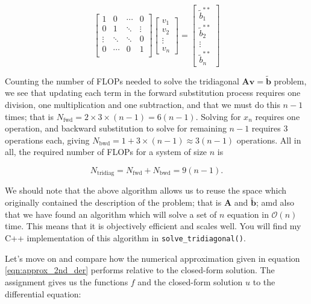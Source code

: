 \documentclass[]{article}
\begin{document}
\begin{equation*}
\left[ \begin{matrix}
1 & 0 & \cdots & 0 \\
0 & 1 & \ddots & \vdots \\
\vdots & \ddots & \ddots & 0\\
0 & \cdots & 0 & 1 \\
\end{matrix} \right]
\left[ \begin{matrix}
v_1 \\
v_2 \\
\vdots \\
v_n
\end{matrix} \right] = 
\left[ \begin{matrix}
\tilde{b}_{1}^{\ast\ast} \\
\tilde{b}_{2}^{\ast\ast} \\
\vdots \\
\tilde{b}_{n}^{\ast\ast}
\end{matrix} \right]
\end{equation*}

Counting the number of FLOPs needed to solve the tridiagonal $\mathbf{Av} = \mathbf{\tilde{b}}$ problem, we see that updating each term in the forward substitution process requires one division, one multiplication and one subtraction, and that we must do this $n-1$ times; that is $N_{\text{fwd}} = 2 \times 3 \times (n-1) = 6(n-1)$. Solving for $x_n$ requires one operation, and backward substitution to solve for remaining $n-1$ requires 3 operations each, giving $N_{\text{bwd}} = 1 + 3 \times (n-1) \approx 3(n-1)$ operations. All in all, the required number of FLOPs for a system of size $n$ is

\begin{equation*}
N_{\text{tridiag}} = N_{\text{fwd}} + N_{\text{bwd}} = 9(n-1).
\end{equation*}

We should note that the above algorithm allows us to reuse the space which originally contained the description of the problem; that is $\mathbf{A}$ and $\mathbf{\tilde{b}}$; amd also that we have found an algorithm which will solve a set of $n$ equation in $\mathcal{O}(n)$ time. This means that it is objectively efficient and scales well. You will find my C++ implementation of this algorithm in \lstinline|solve_tridiagonal()|. 

Let's move on and compare how the numerical approximation given in equation \ref{eqn:approx_2nd_der} performs relative to the closed-form solution. The assignment gives us the functions $f$ and the closed-form solution $u$ to the differential equation:
\end{document}
